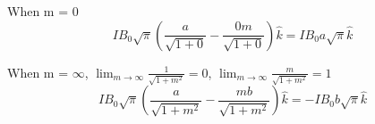 \documentclass[../homework.tex]{subfiles}
\begin{document}
\indent \indent When m = 0
\begin{equation*}
    I B_0 \sqrt{\pi} \left(\frac{a}{\sqrt{1 + 0}} - \frac{0 m}{\sqrt{1 + 0}} \right) \hat{k} = I B_0 a \sqrt{\pi} \hat{k}
\end{equation*}

When m = $\infty$, $\lim_{m \to \infty} \frac{1}{\sqrt{1+m^2}} = 0$, $\lim_{m \to \infty} \frac{m}{\sqrt{1+m^2}} = 1$
\begin{equation*}
    I B_0 \sqrt{\pi} \left(\frac{a}{\sqrt{1 + m^2}} - \frac{mb}{\sqrt{1 + m^2}} \right) \hat{k} = -I B_0 b \sqrt{\pi} \hat{k}
\end{equation*}
\end{document}
